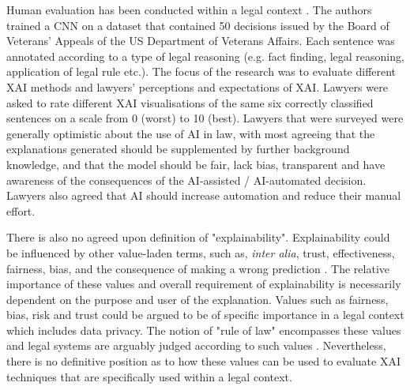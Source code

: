 Human evaluation has been conducted within a legal context \cite{gorski2021}. The authors trained a CNN on a dataset that contained 50 decisions issued by the Board of Veterans' Appeals of the US Department of Veterans Affairs. Each sentence was annotated according to a type of legal reasoning (e.g. fact finding, legal reasoning, application of legal rule etc.). The focus of the research was to evaluate different XAI methods and lawyers' perceptions and expectations of XAI. Lawyers were asked to rate different XAI visualisations of the same six correctly classified sentences on a scale from 0 (worst) to 10 (best). Lawyers that were surveyed were generally optimistic about the use of AI in law, with most agreeing that the explanations generated should be supplemented by further background knowledge, and that the model should be fair, lack bias, transparent and have awareness of the consequences of the AI-assisted / AI-automated decision. Lawyers also agreed that AI should increase automation and reduce their manual effort. 

There is also no agreed upon definition of "explainability". Explainability could be influenced by other value-laden terms, such as, \textit{inter alia}, trust, effectiveness, fairness, bias, and the consequence of making a wrong prediction \cite{rosenfeld2021}. The relative importance of these values and overall requirement of explainability is necessarily dependent on the purpose and user of the explanation. Values such as fairness, bias, risk and trust could be argued to be of specific importance in a legal context which includes data privacy. The notion of "rule of law" encompasses these values and legal systems are arguably judged according to such values \cite{greenstein2022}. Nevertheless, there is no definitive position as to how these values can be used to evaluate XAI techniques that are specifically used within a legal context.

